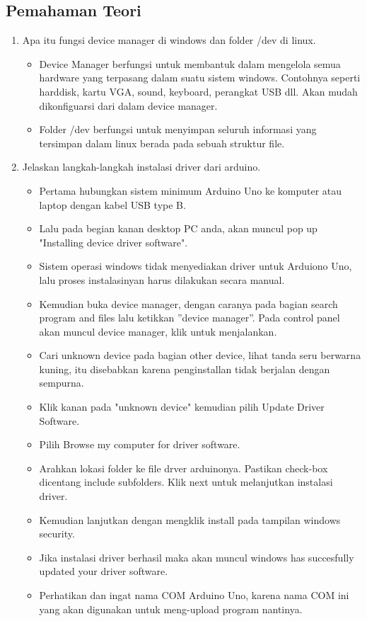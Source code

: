 \subsection{Pemahaman Teori}
\begin{enumerate}
    \item Apa itu fungsi device manager di windows dan folder /dev di linux.
    \begin{itemize}
        \item Device  Manager berfungsi untuk membantuk dalam mengelola semua hardware yang terpasang dalam suatu sistem windows. Contohnya seperti harddisk, kartu VGA, sound, keyboard, perangkat USB dll. Akan mudah dikonfiguarsi dari dalam device manager.
        \item Folder /dev berfungsi untuk menyimpan seluruh informasi yang tersimpan dalam linux berada pada sebuah struktur file.
    \end{itemize}
    
    \item Jelaskan langkah-langkah instalasi driver dari arduino.
    \begin{itemize}
        \item Pertama hubungkan sistem minimum Arduino Uno ke komputer atau laptop dengan kabel USB type B.
        \item Lalu pada begian kanan desktop PC anda, akan muncul pop up "Installing device driver software".
        \item Sistem operasi windows tidak menyediakan driver untuk Arduiono Uno, lalu proses instalasinyan harus dilakukan secara manual.
        \item Kemudian buka device manager, dengan caranya pada bagian search program and files lalu ketikkan ”device manager”. Pada control panel akan muncul device manager, klik untuk menjalankan.
        \item Cari unknown device pada bagian other device, lihat tanda seru berwarna kuning, itu disebabkan karena penginstallan tidak berjalan dengan sempurna.
        \item Klik kanan pada "unknown device" kemudian pilih Update Driver Software.
        \item Pilih Browse my computer for driver software.
        \item Arahkan lokasi folder ke file drver arduinonya. Pastikan check-box dicentang include subfolders. Klik next untuk melanjutkan instalasi driver.
        \item Kemudian lanjutkan dengan mengklik install pada tampilan windows security.
        \item Jika instalasi driver berhasil maka akan muncul windows has succesfully updated your driver software.
        \item Perhatikan dan ingat nama COM Arduino Uno, karena nama COM ini yang akan digunakan untuk meng-upload program nantinya.
    \end{itemize}
    

\end{enumerate}

